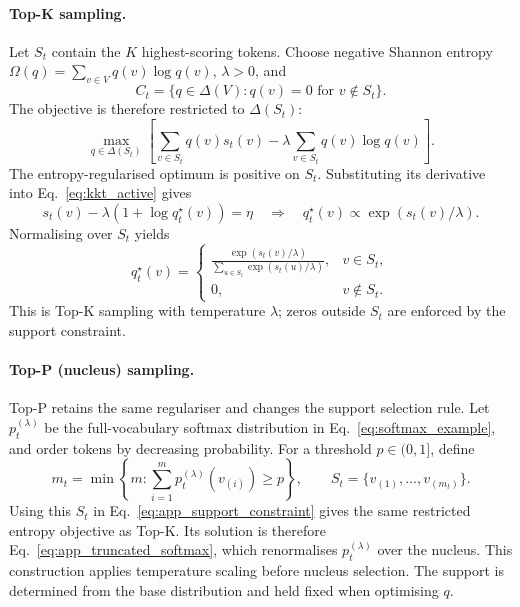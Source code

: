 \documentclass{article} %
\begin{document}
\paragraph{Top-K sampling.}
Let $S_t$ contain the $K$ highest-scoring tokens.
Choose negative Shannon entropy
$\Omega(q)=\sum_{v\in V}q(v)\log q(v)$, $\lambda>0$, and
\begin{equation}
C_t
=
\{q\in\Delta(V):q(v)=0\text{ for }v\notin S_t\}.
\label{eq:app_support_constraint}
\end{equation}
The objective is therefore restricted to $\Delta(S_t)$:
\begin{equation}
\max_{q\in\Delta(S_t)}
\left[
\sum_{v\in S_t}q(v)s_t(v)
-\lambda\sum_{v\in S_t}q(v)\log q(v)
\right].
\end{equation}
The entropy-regularised optimum is positive on $S_t$.
Substituting its derivative into Eq.~\ref{eq:kkt_active} gives
\begin{equation}
s_t(v)-\lambda(1+\log q_t^\star(v))=\eta
\quad\Longrightarrow\quad
q_t^\star(v)\propto\exp(s_t(v)/\lambda).
\end{equation}
Normalising over $S_t$ yields
\begin{equation}
q_t^\star(v)
=
\begin{cases}
\displaystyle
\frac{\exp(s_t(v)/\lambda)}
{\sum_{u\in S_t}\exp(s_t(u)/\lambda)},
& v\in S_t,\\[6pt]
0, & v\notin S_t.
\end{cases}
\label{eq:app_truncated_softmax}
\end{equation}
This is Top-K sampling with temperature $\lambda$;
zeros outside $S_t$ are enforced by the support constraint.

\paragraph{Top-P (nucleus) sampling.}
Top-P retains the same regulariser and changes the support
selection rule. Let $p_t^{(\lambda)}$ be the full-vocabulary
softmax distribution in Eq.~\ref{eq:softmax_example}, and order
tokens by decreasing probability.
For a threshold $p\in(0,1]$, define
\begin{equation}
m_t
=
\min\left\{
m:\sum_{i=1}^{m}p_t^{(\lambda)}(v_{(i)})\geq p
\right\},
\qquad
S_t=\{v_{(1)},\ldots,v_{(m_t)}\}.
\end{equation}
Using this $S_t$ in Eq.~\ref{eq:app_support_constraint}
gives the same restricted entropy objective as Top-K.
Its solution is therefore Eq.~\ref{eq:app_truncated_softmax},
which renormalises $p_t^{(\lambda)}$ over the nucleus.
This construction applies temperature scaling before nucleus
selection. The support is determined from the base distribution
and held fixed when optimising $q$.
\end{document}

